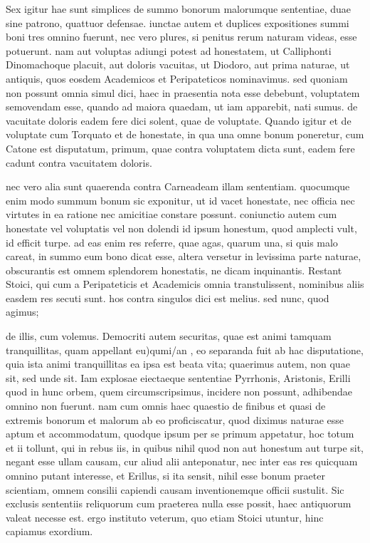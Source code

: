  Sex igitur hae sunt simplices de summo bonorum malorumque sententiae, duae sine patrono, quattuor defensae. iunctae autem et duplices expositiones summi boni tres omnino fuerunt, nec vero plures, si penitus rerum naturam videas, esse potuerunt. nam aut voluptas adiungi potest ad honestatem, ut Calliphonti Dinomachoque placuit, aut doloris vacuitas, ut Diodoro, aut prima naturae, ut antiquis, quos eosdem Academicos et Peripateticos nominavimus. sed quoniam non possunt omnia simul dici, haec in praesentia nota esse debebunt, voluptatem semovendam esse, quando ad maiora quaedam, ut iam apparebit, nati sumus. de vacuitate doloris eadem fere dici solent, quae de voluptate. Quando igitur et de voluptate cum Torquato et de honestate, in qua una omne bonum poneretur, cum Catone est disputatum, primum, quae contra voluptatem dicta sunt, eadem fere cadunt contra vacuitatem doloris.

 nec vero alia sunt quaerenda contra Carneadeam illam sententiam. quocumque enim modo summum bonum sic exponitur, ut id vacet honestate, nec officia nec virtutes in ea ratione nec amicitiae constare possunt. coniunctio autem cum honestate vel voluptatis vel non dolendi id ipsum honestum, quod amplecti vult, id efficit turpe. ad eas enim res referre, quae agas, quarum una, si quis malo careat, in summo eum bono dicat esse, altera versetur in levissima parte naturae, obscurantis est omnem splendorem honestatis, ne dicam inquinantis. Restant Stoici, qui cum a Peripateticis et Academicis omnia transtulissent, nominibus aliis easdem res secuti sunt. hos contra singulos dici est melius. sed nunc, quod agimus;

 de illis, cum volemus. Democriti autem securitas, quae est animi tamquam tranquillitas, quam appellant eu)qumi/an , eo separanda fuit ab hac disputatione, quia ista animi tranquillitas ea ipsa est beata vita; quaerimus autem, non quae sit, sed unde sit. Iam explosae eiectaeque sententiae Pyrrhonis, Aristonis, Erilli quod in hunc orbem, quem circumscripsimus, incidere non possunt, adhibendae omnino non fuerunt. nam cum omnis haec quaestio de finibus et quasi de extremis bonorum et malorum ab eo proficiscatur, quod diximus naturae esse aptum et accommodatum, quodque ipsum per se primum appetatur, hoc totum et ii tollunt, qui in rebus iis, in quibus nihil quod non aut honestum aut turpe sit, negant esse ullam causam, cur aliud alii anteponatur, nec inter eas res quicquam omnino putant interesse, et Erillus, si ita sensit, nihil esse bonum praeter scientiam, omnem consilii capiendi causam inventionemque officii sustulit. Sic exclusis sententiis reliquorum cum praeterea nulla esse possit, haec antiquorum valeat necesse est. ergo instituto veterum, quo etiam Stoici utuntur, hinc capiamus exordium.

